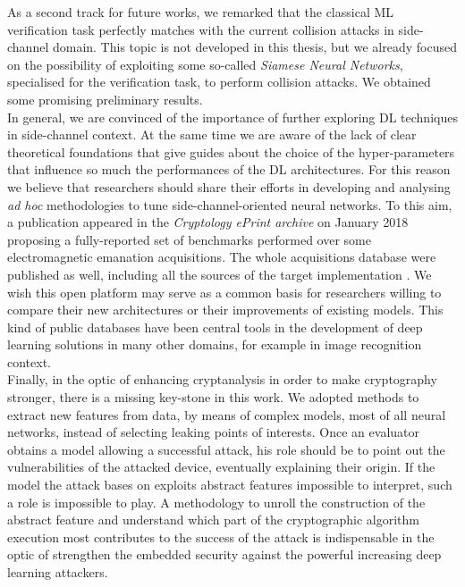 As a second track for future works, we remarked that the classical ML verification task perfectly matches with the current collision attacks in side-channel domain. This topic is not developed in this thesis, but we already focused on the possibility of exploiting some so-called \emph{Siamese Neural Networks}, specialised for the verification task, to perform collision attacks. We obtained some promising preliminary results. \\

In general, we are convinced of the importance of further exploring DL techniques in side-channel context. At the same time we are aware of the lack of clear theoretical foundations that give guides about the choice of the hyper-parameters that influence so much the performances of the DL architectures. For this reason we believe that researchers should share their efforts in developing and analysing \textit{ad hoc} methodologies to tune side-channel-oriented neural networks. To this aim, a publication appeared in the \emph{Cryptology ePrint archive} on January 2018 proposing a fully-reported set of benchmarks performed over some electromagnetic emanation acquisitions. The whole acquisitions database were published as well, including all the sources of the target implementation  \cite{eprintASCADpaper}. We wish this open platform may serve as a common basis for researchers willing to compare their new architectures or their improvements of existing models. This kind of public databases have been central tools in the development of deep learning solutions in many other domains, for example in image recognition context.\\

Finally, in the optic of enhancing cryptanalysis in order to make cryptography stronger, there is a missing key-stone in this work. We adopted methods to extract new features from data, by means of complex models, most of all neural networks, instead of selecting leaking points of interests. Once an evaluator obtains a model allowing a successful attack, his role should be to point out the vulnerabilities of the attacked device, eventually explaining their origin. If the model the attack bases on exploits abstract features impossible to interpret, such a role is impossible to play. A methodology to unroll the construction of the abstract feature and understand which part of the cryptographic algorithm execution most contributes to the success of the attack is indispensable in the optic of strengthen the embedded security against the powerful increasing deep learning attackers.

